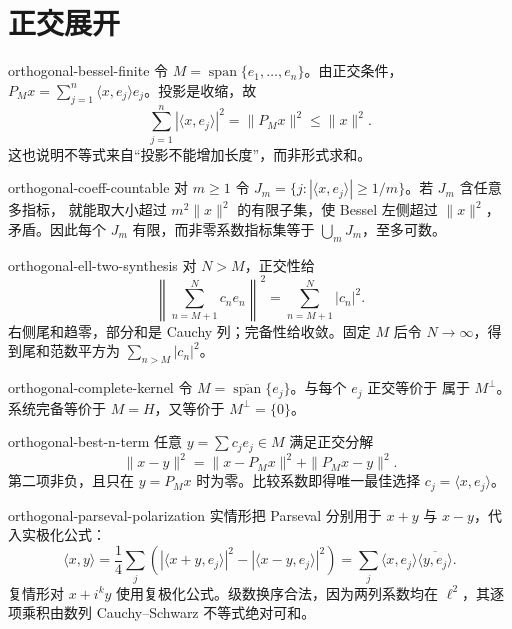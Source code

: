 \chapter{正交展开}

\begin{solution}{orthogonal-bessel-finite}
令 \(M=\operatorname{span}\{e_1,\ldots,e_n\}\)。由正交条件，
\(P_Mx=\sum_{j=1}^n\langle x,e_j\rangle e_j\)。投影是收缩，故
\[
 \sum_{j=1}^n|\langle x,e_j\rangle|^2=\|P_Mx\|^2\le\|x\|^2.
\]
这也说明不等式来自“投影不能增加长度”，而非形式求和。
\end{solution}

\begin{solution}{orthogonal-coeff-countable}
对 \(m\ge1\) 令
\(J_m=\{j:|\langle x,e_j\rangle|\ge1/m\}\)。若 \(J_m\) 含任意多指标，
就能取大小超过 \(m^2\|x\|^2\) 的有限子集，使 Bessel 左侧超过
\(\|x\|^2\)，矛盾。因此每个 \(J_m\) 有限，而非零系数指标集等于
\(\bigcup_mJ_m\)，至多可数。
\end{solution}

\begin{solution}{orthogonal-ell-two-synthesis}
对 \(N>M\)，正交性给
\[
 \left\|\sum_{n=M+1}^Nc_ne_n\right\|^2=\sum_{n=M+1}^N|c_n|^2.
\]
右侧尾和趋零，部分和是 Cauchy 列；完备性给收敛。固定 \(M\) 后令
\(N\to\infty\)，得到尾和范数平方为 \(\sum_{n>M}|c_n|^2\)。
\end{solution}

\begin{solution}{orthogonal-complete-kernel}
令 \(M=\overline{\operatorname{span}}\{e_j\}\)。与每个 \(e_j\) 正交等价于
属于 \(M^\perp\)。系统完备等价于 \(M=H\)，又等价于
\(M^\perp=\{0\}\)。
\end{solution}

\begin{solution}{orthogonal-best-n-term}
任意 \(y=\sum c_je_j\in M\) 满足正交分解
\[
 \|x-y\|^2=\|x-P_Mx\|^2+\|P_Mx-y\|^2.
\]
第二项非负，且只在 \(y=P_Mx\) 时为零。比较系数即得唯一最佳选择
\(c_j=\langle x,e_j\rangle\)。
\end{solution}

\begin{solution}{orthogonal-parseval-polarization}
实情形把 Parseval 分别用于 \(x+y\) 与 \(x-y\)，代入实极化公式：
\[
 \langle x,y\rangle
 =\frac14\sum_j\left(|\langle x+y,e_j\rangle|^2
 -|\langle x-y,e_j\rangle|^2\right)
 =\sum_j\langle x,e_j\rangle\overline{\langle y,e_j\rangle}.
\]
复情形对 \(x+i^ky\) 使用复极化公式。级数换序合法，因为两列系数均在
\(\ell^2\)，其逐项乘积由数列 Cauchy--Schwarz 不等式绝对可和。
\end{solution}


